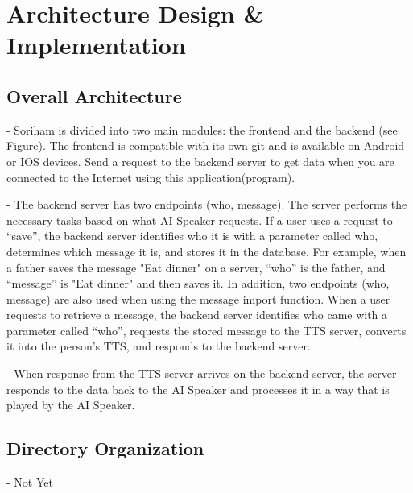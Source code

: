 \documentclass[conference]{IEEEtran}
\begin{document}
\section{Architecture Design \& Implementation}
\subsection{Overall Architecture}
- Soriham is divided into two main modules: the frontend and the backend (see Figure). The frontend is compatible with its own git and is available on Android or IOS devices. Send a request to the backend server to get data when you are connected to the Internet using this application(program).

- The backend server has two endpoints (who, message). The server performs the necessary tasks based on what AI Speaker requests. If a user uses a request to “save”, the backend server identifies who it is with a parameter called who, determines which message it is, and stores it in the database. For example, when a father saves the message "Eat dinner" on a server, “who” is the father, and “message” is "Eat dinner" and then saves it.
In addition, two endpoints (who, message) are also used when using the message import function. When a user requests to retrieve a message, the backend server identifies who came with a parameter called “who”, requests the stored message to the TTS server, converts it into the person's TTS, and responds to the backend server.

- When response from the TTS server arrives on the backend server, the server responds to the data back to the AI Speaker and processes it in a way that is played by the AI Speaker.\\

\subsection{Directory Organization}
- Not Yet\\
\end{document}

